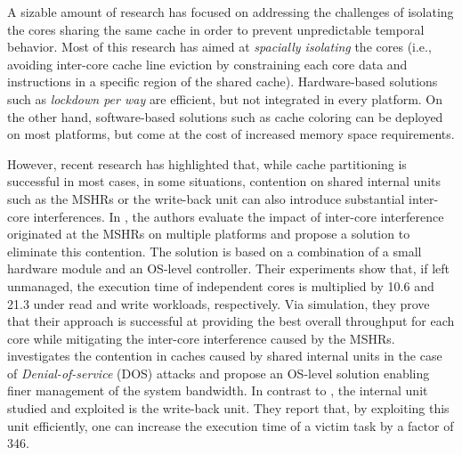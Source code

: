     A sizable amount of research has focused on addressing the challenges of isolating the cores sharing the same cache in order to prevent unpredictable temporal behavior.
    Most of this research \cite{Mancuso2013RealtimeCM, 6755286} has aimed at \emph{spacially isolating} the cores (i.e., avoiding inter-core cache line eviction by constraining each core data and instructions in a specific region of the shared cache).
    Hardware-based solutions such as \emph{lockdown per way} \cite{Giovani_cahe_partitioning_survey} are efficient, but not integrated in every platform.
    On the other hand, software-based solutions such as cache coloring \cite{Mancuso2013RealtimeCM, determ_virt} can be deployed on most platforms, but come at the cost of increased memory space requirements.

    However, recent research \cite{Valsan2017AddressingIC, Heechul_DDOS_attacks_on_shared_cache} has highlighted that, while cache partitioning is successful in most cases, in some situations, contention on shared internal units such as the MSHRs or the write-back unit can also introduce substantial inter-core interferences.
    In \cite{Valsan2017AddressingIC}, the authors evaluate the impact of inter-core interference originated at the MSHRs on multiple platforms and propose a solution to eliminate this contention. The solution is based on a combination of a small hardware module and an OS-level controller.
    Their experiments show that, if left unmanaged, the execution time of independent cores is multiplied by 10.6 and 21.3 under read and write workloads, respectively.
    Via simulation, they prove that their approach is successful at providing the best overall throughput for each core while mitigating the inter-core interference caused by the MSHRs.
    \cite{Heechul_DDOS_attacks_on_shared_cache} investigates the contention in caches caused by shared internal units in the case of \emph{Denial-of-service} (DOS) attacks and propose an OS-level solution enabling finer management of the system bandwidth.
    In contrast to \cite{Valsan2017AddressingIC}, the internal unit studied and exploited is the write-back unit.
    They report that, by exploiting this unit efficiently, one can increase the execution time of a victim task by a factor of 346.
